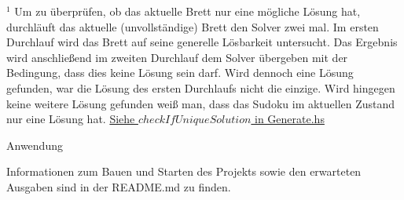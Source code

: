 $^1$ Um zu überprüfen, ob das aktuelle Brett nur eine mögliche Lösung hat, durchläuft das aktuelle (unvollständige) Brett den Solver zwei mal. Im ersten Durchlauf wird das Brett auf seine generelle Lösbarkeit untersucht. Das Ergebnis wird anschließend im zweiten Durchlauf dem Solver übergeben mit der Bedingung, dass dies keine Lösung sein darf. Wird dennoch eine Lösung gefunden, war die Lösung des ersten Durchlaufs nicht die einzige. Wird hingegen keine weitere Lösung gefunden weiß man, dass das Sudoku im aktuellen Zustand nur eine Lösung hat. \newline
\underline{Siehe \(checkIfUniqueSolution\) in Generate.hs}

\vspace{2ex}

\begin{Large}
    Anwendung
\end{Large}
\vspace{2ex}

Informationen zum Bauen und Starten des Projekts sowie den erwarteten Ausgaben sind in der README.md zu finden. \newline


